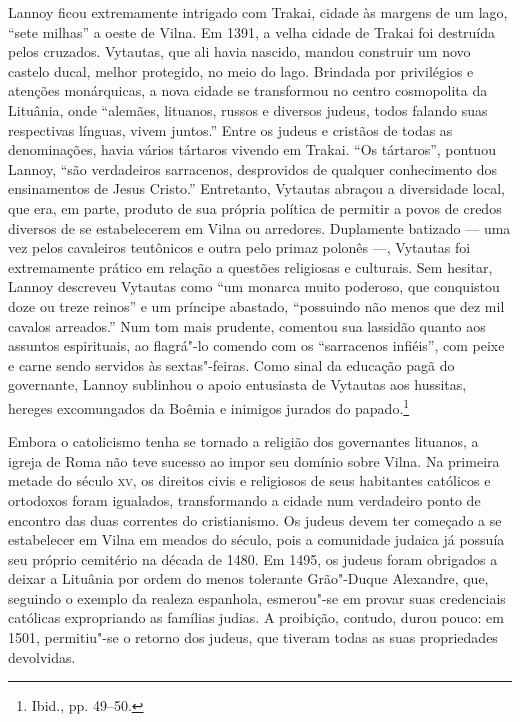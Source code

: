 Lannoy ficou extremamente intrigado com Trakai, cidade às margens de um
lago, ``sete milhas'' a oeste de Vilna. Em 1391, a velha cidade de
Trakai foi destruída pelos cruzados. Vytautas, que ali havia nascido,
mandou construir um novo castelo ducal, melhor protegido, no meio do
lago. Brindada por privilégios e atenções monárquicas, a nova cidade se
transformou no centro cosmopolita da Lituânia, onde ``alemães, lituanos,
russos e diversos judeus, todos falando suas respectivas línguas, vivem
juntos.'' Entre os judeus e cristãos de todas as denominações, havia
vários tártaros vivendo em Trakai. ``Os tártaros'', pontuou Lannoy,
``são verdadeiros sarracenos, desprovidos de qualquer conhecimento dos
ensinamentos de Jesus Cristo.'' Entretanto, Vytautas abraçou a
diversidade local, que era, em parte, produto de sua própria política de
permitir a povos de credos diversos de se estabelecerem em Vilna ou
arredores. Duplamente batizado --- uma vez pelos cavaleiros teutônicos e
outra pelo primaz polonês ---, Vytautas foi extremamente prático em
relação a questões religiosas e culturais. Sem hesitar, Lannoy descreveu
Vytautas como ``um monarca muito poderoso, que conquistou doze ou treze
reinos'' e um príncipe abastado, ``possuindo não menos que dez mil
cavalos arreados.'' Num tom mais prudente, comentou sua lassidão quanto
aos assuntos espirituais, ao flagrá"-lo comendo com os ``sarracenos
infiéis'', com peixe e carne sendo servidos às sextas"-feiras. Como sinal
da educação pagã do governante, Lannoy sublinhou o apoio entusiasta de
Vytautas aos hussitas, hereges excomungados da Boêmia e inimigos jurados
do papado.\footnote{Ibid., pp. 49--50.}

\asterisc

Embora o catolicismo tenha se tornado a religião dos governantes
lituanos, a igreja de Roma não teve sucesso ao impor seu domínio sobre
Vilna. Na primeira metade do século \textsc{xv}, os direitos civis e religiosos
de seus habitantes católicos e ortodoxos foram igualados, transformando
a cidade num verdadeiro ponto de encontro das duas correntes do
cristianismo. Os judeus devem ter começado a se estabelecer em Vilna em
meados do século, pois a comunidade judaica já possuía seu próprio
cemitério na década de 1480. Em 1495, os judeus foram obrigados a deixar
a Lituânia por ordem do menos tolerante Grão"-Duque Alexandre, que,
seguindo o exemplo da realeza espanhola, esmerou"-se em provar suas
credenciais católicas expropriando as famílias judias. A proibição,
contudo, durou pouco: em 1501, permitiu"-se o retorno dos judeus, que
tiveram todas as suas propriedades devolvidas.

